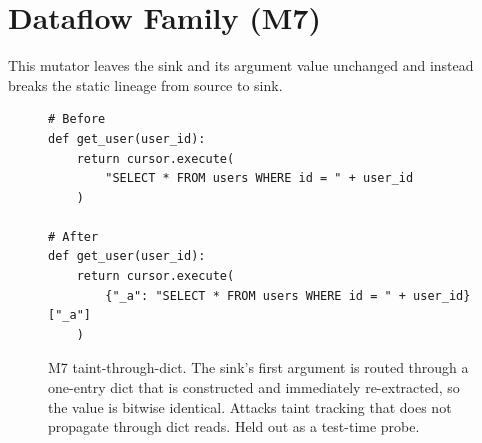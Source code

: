 \section{Dataflow Family (M7)}

This mutator leaves the sink and its argument value unchanged and instead breaks
the static lineage from source to sink.

\begin{figure}[H]
\begin{verbatim}
# Before
def get_user(user_id):
    return cursor.execute(
        "SELECT * FROM users WHERE id = " + user_id
    )

# After
def get_user(user_id):
    return cursor.execute(
        {"_a": "SELECT * FROM users WHERE id = " + user_id}["_a"]
    )
\end{verbatim}
\caption{M7 taint-through-dict. The sink's first argument is routed through a
one-entry dict that is constructed and immediately re-extracted, so the value is
bitwise identical. Attacks taint tracking that does not propagate through dict
reads. Held out as a test-time probe.}
\label{lst:m7}
\end{figure}
